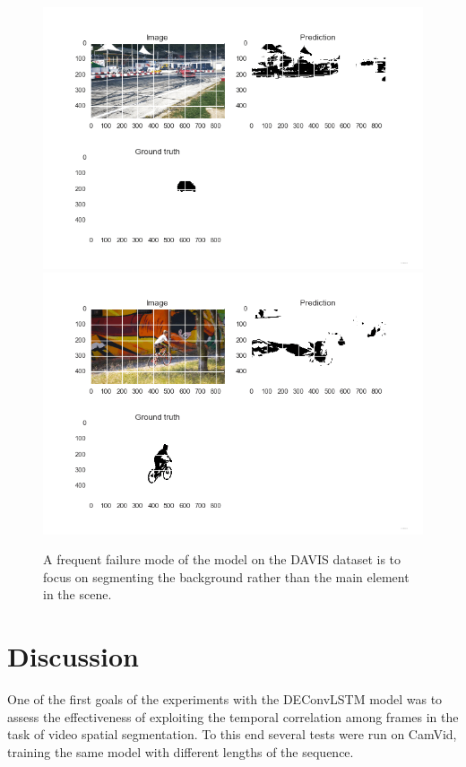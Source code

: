 \begin{figure}[t]
    \centering
    \includegraphics[trim={0 15mm 0 0},width=0.8\columnwidth]{img/deconvLSTM/drift-0.png}\\
    \includegraphics[trim={0 15mm 0 0},width=0.8\columnwidth]{img/deconvLSTM/bmx-trees-0.png}
    \caption{A frequent failure mode of the model on the DAVIS dataset is to
        focus on segmenting the background rather than the main element in the
        scene.}
    \label{fig:deconvlstm_gatech_failure}
\end{figure}



\section{Discussion}\label{sec:deconvLSTM_discussion}
One of the first goals of the experiments with the DEConvLSTM model was to
assess the effectiveness of exploiting the temporal correlation among frames in
the task of video spatial segmentation. To this end several tests were run on
CamVid, training the same model with different lengths of the sequence.

